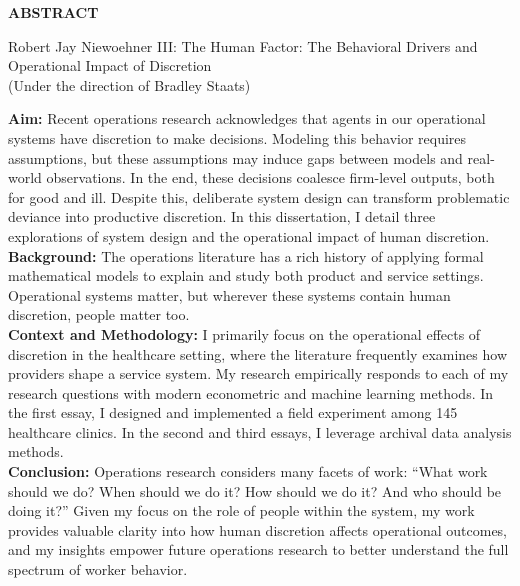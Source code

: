 
\begin{center}
\vspace*{2in} %
{\normalfont\textbf{ABSTRACT}}
\vspace{11pt}

\begin{singlespace}
Robert Jay Niewoehner III: The Human Factor: The Behavioral Drivers and Operational Impact of Discretion \\
(Under the direction of Bradley Staats)
\end{singlespace}
\end{center}


\noindent
\textbf{Aim:} Recent operations research acknowledges that agents in our operational systems have discretion to make decisions. Modeling this behavior requires assumptions, but these assumptions may induce gaps between models and real-world observations. In the end, these decisions coalesce firm-level outputs, both for good and ill. Despite this, deliberate system design can transform problematic deviance into productive discretion. In this dissertation, I detail three explorations of system design and the operational impact of human discretion. \\
\textbf{Background:} The operations literature has a rich history of applying formal mathematical models to explain and study both product and service settings. Operational systems matter, but wherever these systems contain human discretion, people matter too. \\
\textbf{Context and Methodology:} I primarily focus on the operational effects of discretion in the healthcare setting, where the literature frequently examines how providers shape a service system. My research empirically responds to each of my research questions with modern econometric and machine learning methods. In the first essay, I designed and implemented a field experiment among 145 healthcare clinics. In the second and third essays, I leverage archival data analysis methods. \\
\textbf{Conclusion:} Operations research considers many facets of work: “What work should we do? When should we do it? How should we do it? And who should be doing it?” Given my focus on the role of people within the system, my work provides valuable clarity into how human discretion affects operational outcomes, and my insights empower future operations research to better understand the full spectrum of worker behavior. \\


\clearpage
